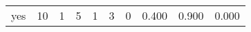 \begin{longtable}{lp{2.0cm}p{2.0cm}p{2.0cm}p{2.0cm}p{2.0cm}p{2.0cm}p{2.0cm}p{2.0cm}p{2.0cm}}
yes       &                     10 &                                             1 &                                            5 &                                           1 &                                            3 &                                          0 &                                0.400 &                                  0.900 &                                0.000 \\
\end{longtable}
